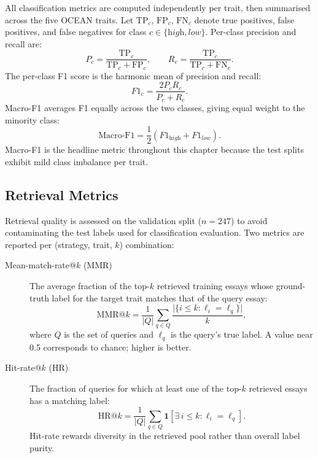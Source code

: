 \documentclass[../main.tex]{subfiles}
\begin{document}
All classification metrics are computed independently per trait, then summarised
across the five OCEAN traits.
Let $\mathrm{TP}_c$, $\mathrm{FP}_c$, $\mathrm{FN}_c$ denote true positives,
false positives, and false negatives for class $c \in \{\textit{high},
\textit{low}\}$.
Per-class precision and recall are:
%
\begin{equation}
  P_c = \frac{\mathrm{TP}_c}{\mathrm{TP}_c + \mathrm{FP}_c},\qquad
  R_c = \frac{\mathrm{TP}_c}{\mathrm{TP}_c + \mathrm{FN}_c}.
\end{equation}
%
The per-class F1 score is the harmonic mean of precision and recall:
%
\begin{equation}
  F1_c = \frac{2 P_c R_c}{P_c + R_c}.
\end{equation}
%
Macro-F1 averages F1 equally across the two classes, giving equal weight to
the minority class:
%
\begin{equation}
  \text{Macro-F1} = \frac{1}{2}\left(F1_{\textit{high}} + F1_{\textit{low}}\right).
\end{equation}
%
Macro-F1 is the headline metric throughout this chapter because the test splits
exhibit mild class imbalance per trait.

\subsection{Retrieval Metrics}

Retrieval quality is assessed on the validation split ($n=247$) to avoid
contaminating the test labels used for classification evaluation.
Two metrics are reported per (strategy, trait, $k$) combination:

\begin{description}
  \item[Mean-match-rate@$k$ (MMR)] The average fraction of the top-$k$
    retrieved training essays whose ground-truth label for the target trait
    matches that of the query essay:
    \begin{equation}
      \text{MMR@}k = \frac{1}{|Q|} \sum_{q \in Q}
        \frac{\bigl|\{i \leq k : \ell_i = \ell_q\}\bigr|}{k},
    \end{equation}
    where $Q$ is the set of queries and $\ell_q$ is the query's true label.
    A value near 0.5 corresponds to chance; higher is better.

  \item[Hit-rate@$k$ (HR)] The fraction of queries for which at least one of
    the top-$k$ retrieved essays has a matching label:
    \begin{equation}
      \text{HR@}k = \frac{1}{|Q|}
        \sum_{q \in Q} \mathbf{1}\!\left[\exists\, i \leq k : \ell_i = \ell_q\right].
    \end{equation}
    Hit-rate rewards diversity in the retrieved pool rather than overall
    label purity.
\end{description}
\end{document}
